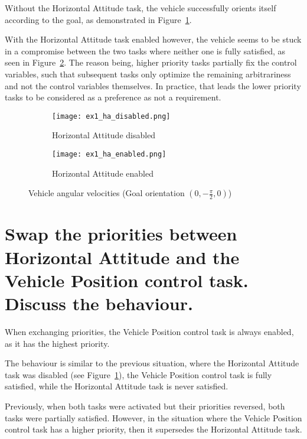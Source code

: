 \begin{questions}
\begin{parts}
\begin{solutionorbox}
			Without the Horizontal Attitude task, the vehicle
			successfully orients itself according to the goal, as
			demonstrated in Figure~\ref{subfig:ex1_ha_disabled}.

			With the Horizontal Attitude task enabled however, the
			vehicle seems to be stuck in a compromise between the
			two tasks where neither one is fully satisfied, as seen
			in Figure~\ref{subfig:ex1_ha_enabled}. The reason being,
			higher priority tasks partially fix the control
			variables, such that subsequent tasks only optimize the
			remaining arbitrariness and not the control variables
			themselves. In practice, that leads the lower priority
			tasks to be considered as a preference as not a
			requirement.
		\end{solutionorbox}
		\begin{figure}
			\begin{subfigure}[b]{0.5\linewidth}
				\centering
				\texttt{[image: ex1\_ha\_disabled.png]}
				\caption{Horizontal Attitude disabled}%
				\label{subfig:ex1_ha_disabled}
			\end{subfigure}%
			\begin{subfigure}[b]{0.5\linewidth}
				\centering
				\texttt{[image: ex1\_ha\_enabled.png]}
				\caption{Horizontal Attitude
				enabled}%
				\label{subfig:ex1_ha_enabled}
			\end{subfigure}

			\caption{Vehicle angular velocities (Goal
			orientation $\left(0, -\frac{\pi}{2}, 0\right)$)}%
			\label{fig:ex1_ha}
		\end{figure}


		\part{Swap the priorities between Horizontal Attitude and the
		Vehicle Position control task. Discuss the behaviour.}
		\begin{solutionorbox}
			When exchanging priorities, the Vehicle Position control
			task is always enabled, as it has the highest priority.

			The behaviour is similar to the previous situation,
			where the Horizontal Attitude task was disabled (see
			Figure~\ref{subfig:ex1_ha_disabled}), the Vehicle
			Position control task is fully satisfied, while the
			Horizontal Attitude task is never satisfied.

			Previously, when both tasks were activated but their
			priorities reversed, both tasks were partially
			satisfied. However, in the situation where the Vehicle
			Position control task has a higher priority, then it
			supersedes the Horizontal Attitude task.


\end{solutionorbox}
\end{parts}
\end{questions}

